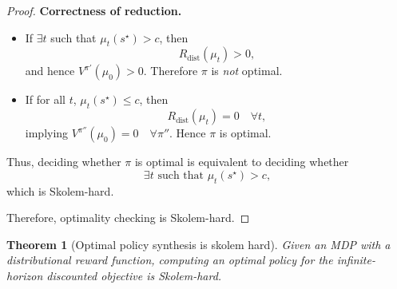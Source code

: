 \documentclass{article}
\newtheorem{theorem}{Theorem}
\begin{document}
\begin{proof}
\medskip

\textbf{Correctness of reduction.}

\begin{itemize}
    \item If $\exists t$ such that $\mu_t(s^\star) > c$, then
    \[
    R_{\mathrm{dist}}(\mu_t) > 0,
    \]
    and hence $V^{\pi'}(\mu_0) > 0$. Therefore $\pi$ is \emph{not} optimal.
    
    \item If for all $t$, $\mu_t(s^\star) \le c$, then
    \[
    R_{\mathrm{dist}}(\mu_t) = 0 \quad \forall t,
    \]
    implying $V^{\pi''}(\mu_0) = 0 \quad \forall \pi''$. Hence $\pi$ is optimal.
\end{itemize}

\medskip

Thus, deciding whether $\pi$ is optimal is equivalent to deciding whether
\[
\exists t \text{ such that } \mu_t(s^\star) > c,
\]
which is Skolem-hard.

\medskip

Therefore, optimality checking is Skolem-hard.
\end{proof}


\begin{theorem}[Optimal policy synthesis is skolem hard]\label{thm: optimal_synthesis_hardness}
Given an MDP with a distributional reward function, computing an optimal policy for the infinite-horizon discounted objective is Skolem-hard.
\end{theorem}
\end{document}
